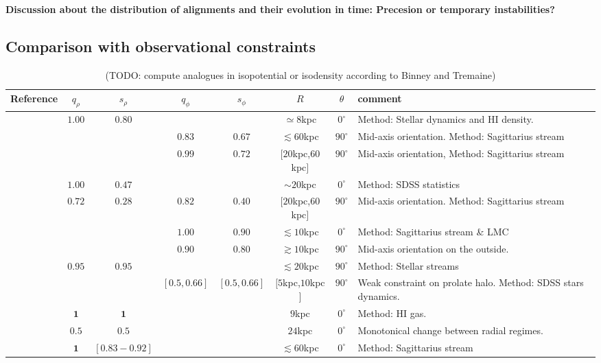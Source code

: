 \documentclass[a4paper,fleqn,usenatbib]{mnras}
\begin{document}
\textbf{Discussion about the distribution of alignments and their
  evolution in time: Precesion or temporary instabilities?} 



\subsection{Comparison with observational constraints}



\begin{table}
\begin{tabular}{|l|cc|cc|c|c|p{4cm}|}\hline
Reference&$q_{\rho}$&$s_{\rho}$&$q_{\phi}$&$s_{\phi}$&$R$&$\theta$&comment\\ \hline \hline
\citet{Olling_and_Merrifield_2000}& $\mathbf{1.00}$ & $\mathbf{0.80}$ & & & $\simeq 8$kpc & $0^{\circ}$&Method: Stellar dynamics and HI density. \\\hline
\citet{Law_and_Majewski_2009}&&&$\mathbf{0.83}$&$\mathbf{0.67}$& $\lesssim 60$kpc&$90^{\circ}$&Mid-axis orientation. Method: Sagittarius stream\\\hline
%
\citet{Law_and_Majewski_2010}&&&$\mathbf{0.99}$&$\mathbf{0.72}$& $[20$kpc,$60$kpc$]$&$90^{\circ}$&Mid-axis orientation, Method: Sagittarius stream\\\hline
%
\citet{Loebman_et_al._2012}&$\mathbf{1.00}$&$\mathbf{0.47}$&&&$\sim 20$kpc &$0^{\circ}$&Method: SDSS statistics\\\hline
%
\citet{Deg_and_Widrow_2013}&$0.72$&$0.28$&$0.82$&$0.40$&$[20$kpc,$60$kpc$]$&$90^{\circ}$& Mid-axis orientation. Method: Sagittarius stream\\\hline
%
\multirow{2}{*}{\citet{Vera-Ciro_and_Helmi_2013}}&&&$\mathbf{1.00}$&$\mathbf{0.90}$&$\lesssim 10$kpc&$0^{\circ}$ & Method: Sagittarius stream \& LMC \\
&&&$\mathbf{0.90}$&$\mathbf{0.80}$&$\gtrsim 10$kpc&$90^{\circ}$& Mid-axis orientation on the outside. \\\hline
%
\citet{Bovy_et_el._2016}&$\mathbf{0.95}$&$\mathbf{0.95}$&&&$\lesssim 20$kpc&$90^{\circ}$ & Method: Stellar streams\\\hline
%
\citet{Bowden_et_al._2016}&&&$\mathbf{[0.5,0.66]}$&$\mathbf{[0.5,0.66]}$&$[5$kpc,$10$kpc$]$&$90^{\circ}$& Weak constraint on prolate halo. Method: SDSS stars dynamics.\\\hline
%
\multirow{2}{*}{\citet{Banerjee_and_Chanda_2011}}&$\mathbf{1}$&$\mathbf{1}$&&&$9$kpc&$0^{\circ}$&Method: HI gas. \\
&$\mathbf{0.5}$&$\mathbf{0.5}$&&&$24$kpc&$0^{\circ}$&Monotonical change between radial regimes.\\\hline
%
\cite{Johnston_et_al._2005}&$\mathbf{1}$&$\mathbf{[0.83-0.92]}$&&&$\lesssim 60$kpc&$0^{\circ}$&Method: Sagittarius stream\\\hline\hline
\end{tabular}
\caption{(TODO: compute analogues in isopotential or isodensity according to Binney and Tremaine)}
\end{table}
\end{document}
